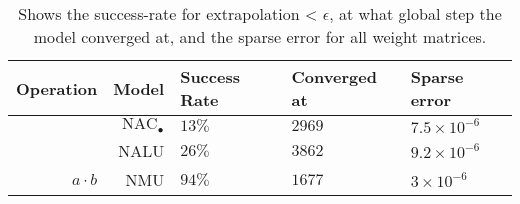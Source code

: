 \begin{table}[H]

\caption{\label{tab:very-simple-function-results}Shows the success-rate for extrapolation < $\epsilon$, at what global step the model converged at, and the sparse error for all weight matrices.}
\centering
\begin{tabular}{rrlll}
\toprule
Operation & Model & Success Rate & Converged at & Sparse error\\
\midrule
 & ${\mathrm{NAC}_\bullet}$ & $13\%$ & $2969$ & $7.5 \times 10^{-6}$\\

 & NALU & $26\%$ & $3862$ & $9.2 \times 10^{-6}$\\

\multirow{-3}{*}{\raggedleft\arraybackslash $a \cdot b$} & NMU & $94\%$ & $1677$ & $3 \times 10^{-6}$\\
\bottomrule
\end{tabular}
\end{table}
